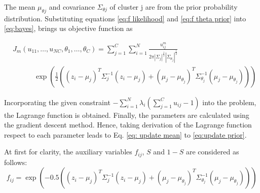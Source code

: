 \documentclass{article}
\begin{document}
The mean $\mu_{\theta j}$ and covariance $\Sigma_{\theta j}$ of cluster j are from the prior probability distribution. Substituting equations \ref{eq:f likelihood} and \ref{eq:f theta prior} into \ref{eq:bayes}, brings us objective function as  

\begin{equation}\label{eq:obj function}
\begin{split}
        & J_m(u_{11}, \ldots, u_{NC}, \theta_1, \ldots, \theta_C)  = \sum_{j=1}^{C}  \sum_{i=1}^{N} \frac{u_{ij}^m}{2\pi \left| \Sigma_j \right|^{\frac{1}{2}} \left| \Sigma_{\theta_j} \right|^{\frac{1}{2}}} \\
         & \quad \quad \quad \exp \left( \frac{1}{2} \left( (z_i - \mu_j)^T \Sigma_j^{-1} (z_i - \mu_j) + (\mu_j - \mu_{\theta_j})^T \Sigma_{\theta_j}^{-1} (\mu_j - \mu_{\theta_j}) \right) \right)
\end{split}
\end{equation}

Incorporating the given constraint $
- \sum_{i=1}^{N} \lambda_i \left( \sum_{j=1}^{C} u_{ij} - 1 \right)$ into the problem, the Lagrange function is obtained. Finally, the parameters are calculated using the gradient descent method. Hence, taking derivation of the Lagrange function respect to each parameter leads to Eq. \ref{eq: update mean} to \ref{eq:update prior}.

At first for clarity, the auxiliary variables $f_{ij}$, $S$ and $1-S$ are considered as follows:
\begin{equation}\label{eq: aux f}
    f_{ij} = \exp \left( -0.5 \left( (z_i - \mu_j)^T \Sigma_j^{-1} (z_i - \mu_j) + (\mu_j - \mu_{\theta_j})^T \Sigma_{\theta_j}^{-1} (\mu_j - \mu_{\theta_j}) \right) \right)
\end{equation}
\end{document}
